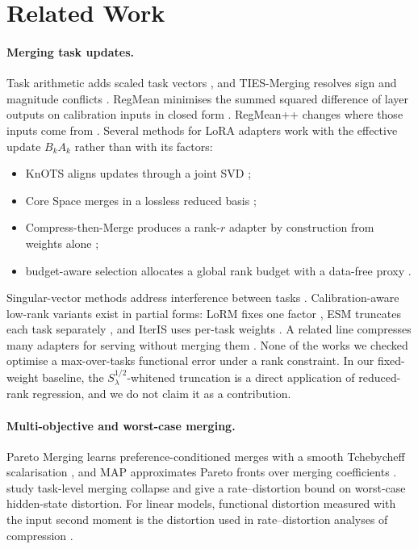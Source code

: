 \section{Related Work}
\label{sec:related}

\paragraph{Merging task updates.} Task arithmetic adds scaled task vectors
\citep{ilharco2022taskarith}, and TIES-Merging resolves sign and magnitude conflicts
\citep{yadav2023ties}. RegMean minimises the summed squared difference of layer outputs on
calibration inputs in closed form \citep{jin2023regmean}. RegMean++ changes where those inputs
come from \citep{nguyen2025regmeanpp}. Several methods for LoRA adapters work with the effective
update $B_kA_k$ rather than with its factors:
\begin{itemize}
\item KnOTS aligns updates through a joint SVD \citep{stoica2024knots};
\item Core Space merges in a lossless reduced basis \citep{panariello2025core};
\item Compress-then-Merge produces a rank-$r$ adapter by construction from weights alone
\citep{he2026ctm};
\item budget-aware selection allocates a global rank budget with a data-free proxy
\citep{amballa2026budget}.
\end{itemize}
Singular-vector methods address interference between tasks \citep{gargiulo2025tsv,marczak2025isoc}.
Calibration-aware low-rank variants exist in partial forms: LoRM fixes one factor
\citep{salami2024lorm}, ESM truncates each task separately \citep{li2026esm}, and IterIS uses
per-task weights \citep{chen2024iteris}. A related line compresses many adapters for serving
without merging them \citep{bruelgabrielsson2024compress}. None of the works we checked optimise a
max-over-tasks functional error under a rank constraint. In our fixed-weight baseline, the
$S_\lambda^{1/2}$-whitened truncation is a direct application of reduced-rank regression, and we
do not claim it as a contribution.

\paragraph{Multi-objective and worst-case merging.} Pareto Merging learns preference-conditioned
merges with a smooth Tchebycheff scalarisation \citep{chen2024pareto}, and MAP approximates Pareto
fronts over merging coefficients \citep{li2024map}. \citet{cao2026collapse} study task-level merging
collapse and give a rate--distortion bound on worst-case hidden-state distortion. For linear models,
functional distortion measured with the input second moment is the distortion used in
rate--distortion analyses of compression \citep{gao2018ratedistortion}.

